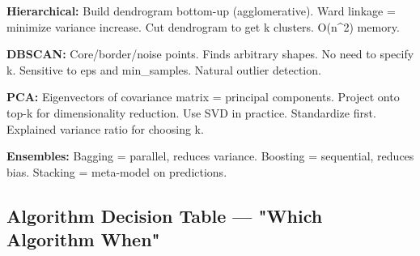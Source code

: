 \documentclass[11pt]{article}
\begin{document}
\textbf{Hierarchical:} Build dendrogram bottom-up (agglomerative). Ward linkage = minimize variance increase. Cut dendrogram to get k clusters. O(n\^{}2) memory.

\textbf{DBSCAN:} Core/border/noise points. Finds arbitrary shapes. No need to specify k. Sensitive to eps and min\_samples. Natural outlier detection.

\textbf{PCA:} Eigenvectors of covariance matrix = principal components. Project onto top-k for dimensionality reduction. Use SVD in practice. Standardize first. Explained variance ratio for choosing k.

\textbf{Ensembles:} Bagging = parallel, reduces variance. Boosting = sequential, reduces bias. Stacking = meta-model on predictions.

\subsection{Algorithm Decision Table --- "Which Algorithm When"}\label{algorithm-decision-table--which-algorithm-when}
\end{document}
